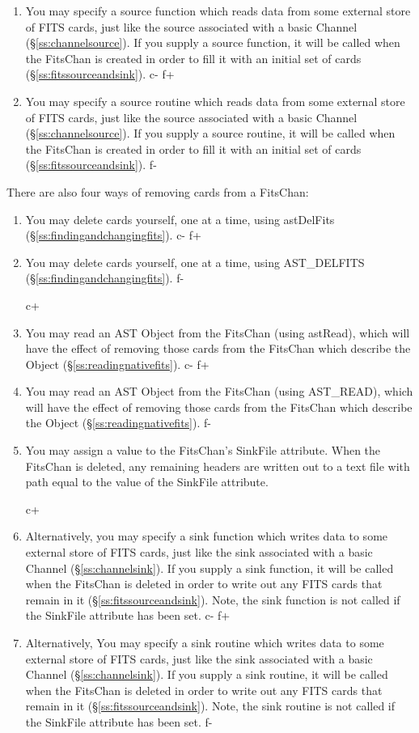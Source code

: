 \documentclass[twoside,11pt]{starlink}
\providecommand{\secref}[1]{\S\ref{#1}}
\begin{document}
{\begin{enumerate}
c+
\item You may specify a source function which reads data from some
external store of FITS cards, just like the source associated with a
basic Channel (\secref{ss:channelsource}). If you supply a source
function, it will be called when the FitsChan is created in order to
fill it with an initial set of cards (\secref{ss:fitssourceandsink}).
c-
f+
\item You may specify a source routine which reads data from some
external store of FITS cards, just like the source associated with a
basic Channel (\secref{ss:channelsource}). If you supply a source
routine, it will be called when the FitsChan is created in order to
fill it with an initial set of cards (\secref{ss:fitssourceandsink}).
f-
\end{enumerate}

There are also four ways of removing cards from a FitsChan:

\begin{enumerate}
c+
\item You may delete cards yourself, one at a time, using astDelFits
(\secref{ss:findingandchangingfits}).
c-
f+
\item You may delete cards yourself, one at a time, using AST\_DELFITS
(\secref{ss:findingandchangingfits}).
f-

c+
\item You may read an AST Object from the FitsChan (using astRead),
which will have the effect of removing those cards from the FitsChan
which describe the Object (\secref{ss:readingnativefits}).
c-
f+
\item You may read an AST Object from the FitsChan (using AST\_READ),
which will have the effect of removing those cards from the FitsChan
which describe the Object (\secref{ss:readingnativefits}).
f-

\item You may assign a value to the FitsChan's SinkFile attribute. When
the FitsChan is deleted, any remaining headers are written out to a text
file with path equal to the value of the SinkFile attribute.

c+
\item Alternatively, you may specify a sink function which writes data to some
external store of FITS cards, just like the sink associated with a
basic Channel (\secref{ss:channelsink}). If you supply a sink function,
it will be called when the FitsChan is deleted in order to write out
any FITS cards that remain in it (\secref{ss:fitssourceandsink}). Note,
the sink function is not called if the SinkFile attribute has been set.
c-
f+
\item Alternatively, You may specify a sink routine which writes data to some
external store of FITS cards, just like the sink associated with a
basic Channel (\secref{ss:channelsink}). If you supply a sink routine,
it will be called when the FitsChan is deleted in order to write out
any FITS cards that remain in it (\secref{ss:fitssourceandsink}). Note,
the sink routine is not called if the SinkFile attribute has been set.
f-
\end{enumerate}

}
\end{document}
